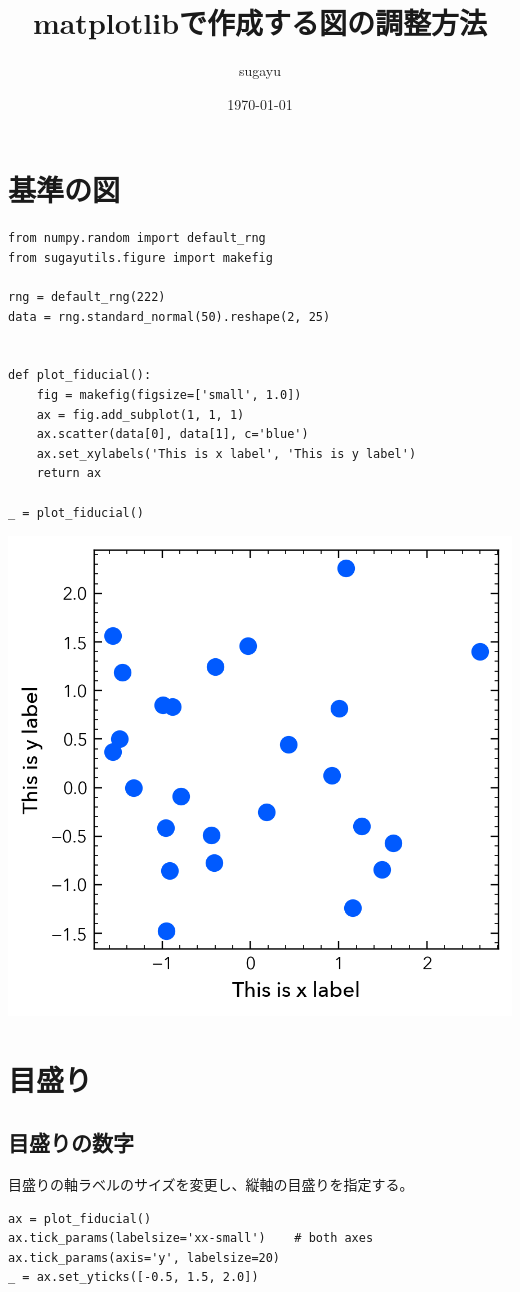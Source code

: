 \documentclass[a4paper, 10pt, notitlepage, twocolumn, uplatex, oneside, dvipdfmx]{jsarticle}
\author{sugayu}
\date{\today}
\title{\textbf{matplotlibで作成する図の調整方法}}
\begin{document}
\maketitle
\tableofcontents

\section{基準の図}
\label{sec:org94ed311}
\begin{verbatim}
from numpy.random import default_rng
from sugayutils.figure import makefig

rng = default_rng(222)
data = rng.standard_normal(50).reshape(2, 25)


def plot_fiducial():
    fig = makefig(figsize=['small', 1.0])
    ax = fig.add_subplot(1, 1, 1)
    ax.scatter(data[0], data[1], c='blue')
    ax.set_xylabels('This is x label', 'This is y label')
    return ax

_ = plot_fiducial()
\end{verbatim}

\begin{center}
\includegraphics[width=.9\linewidth]{./obipy-resources/fiducial.png}
\end{center}
\section{目盛り}
\label{sec:org19561f2}
\subsection{目盛りの数字}
\label{sec:org6da1e1f}
目盛りの軸ラベルのサイズを変更し、縦軸の目盛りを指定する。
\begin{verbatim}
ax = plot_fiducial()
ax.tick_params(labelsize='xx-small')    # both axes
ax.tick_params(axis='y', labelsize=20)
_ = ax.set_yticks([-0.5, 1.5, 2.0])
\end{verbatim}
\end{document}
